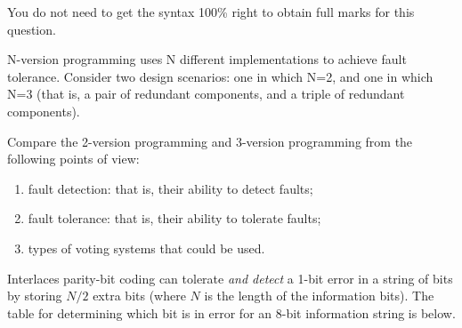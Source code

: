 


You do not need to get the syntax 100\% right to obtain full marks for this question.



N-version programming uses N different implementations to achieve fault tolerance. Consider two design scenarios: one in which N=2, and one in which N=3 (that is, a pair of redundant components, and a triple of redundant components).

Compare the 2-version programming and 3-version programming from the following points of view: 

\begin{enumerate}

 \item fault detection: that is, their ability to detect faults;

 \item fault tolerance: that is, their ability to tolerate faults;

 \item types of voting systems that could be used.

\end{enumerate}



Interlaces parity-bit coding can tolerate \emph{and detect} a 1-bit error in a string of bits by storing $N/2$ extra bits (where $N$ is the length of the information bits). The table for determining which bit is in error for an 8-bit information string is below.

